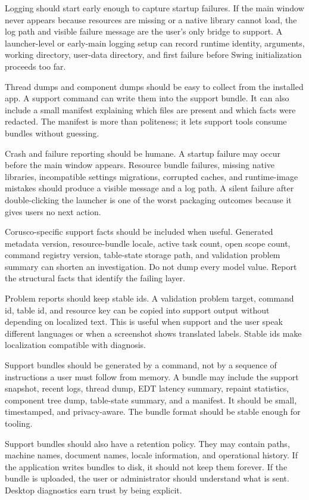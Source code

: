 Logging should start early enough to capture startup failures. If the main window never appears because resources are missing or a native library cannot load, the log path and visible failure message are the user's only bridge to support. A launcher-level or early-main logging setup can record runtime identity, arguments, working directory, user-data directory, and first failure before Swing initialization proceeds too far.

Thread dumps and component dumps should be easy to collect from the installed app. A support command can write them into the support bundle. It can also include a small manifest explaining which files are present and which facts were redacted. The manifest is more than politeness; it lets support tools consume bundles without guessing.

Crash and failure reporting should be humane. A startup failure may occur before the main window appears. Resource bundle failures, missing native libraries, incompatible settings migrations, corrupted caches, and runtime-image mistakes should produce a visible message and a log path. A silent failure after double-clicking the launcher is one of the worst packaging outcomes because it gives users no next action.

Corusco-specific support facts should be included when useful. Generated metadata version, resource-bundle locale, active task count, open scope count, command registry version, table-state storage path, and validation problem summary can shorten an investigation. Do not dump every model value. Report the structural facts that identify the failing layer.

Problem reports should keep stable ids. A validation problem target, command id, table id, and resource key can be copied into support output without depending on localized text. This is useful when support and the user speak different languages or when a screenshot shows translated labels. Stable ids make localization compatible with diagnosis.

Support bundles should be generated by a command, not by a sequence of instructions a user must follow from memory. A bundle may include the support snapshot, recent logs, thread dump, EDT latency summary, repaint statistics, component tree dump, table-state summary, and a manifest. It should be small, timestamped, and privacy-aware. The bundle format should be stable enough for tooling.

Support bundles should also have a retention policy. They may contain paths, machine names, document names, locale information, and operational history. If the application writes bundles to disk, it should not keep them forever. If the bundle is uploaded, the user or administrator should understand what is sent. Desktop diagnostics earn trust by being explicit.

